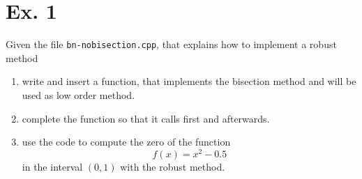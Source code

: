 \section*{Ex. 1}

Given the file \texttt{bn-nobisection.cpp}, that explains how to implement a
robust method
\begin{enumerate}

    \item write and insert a  function, that implements the
    bisection method and will be used as low order method.

    \item complete the  function so that it calls 
    first and  afterwards.

    \item use the code to compute the zero of the function
       \begin{equation*}
         f(x) = x^2 - 0.5
       \end{equation*}
       in the interval $(0, 1)$ with the robust method.

\end{enumerate}
